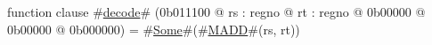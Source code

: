 function clause #\hyperref[zdecode]{decode}# (0b011100 @ rs : regno @ rt : regno @ 0b00000 @ 0b00000 @ 0b000000) =
  #\hyperref[zSome]{Some}#(#\hyperref[zMADD]{MADD}#(rs, rt))
